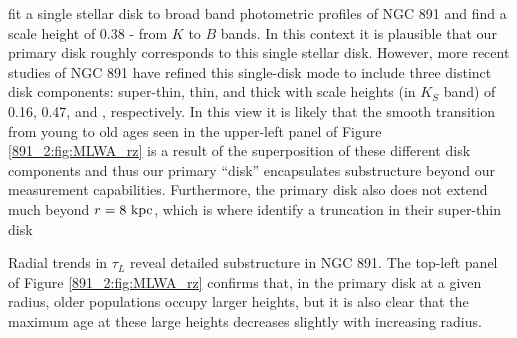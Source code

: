 \citet{Xilouris99} fit a single stellar disk to broad band photometric
profiles of NGC 891 and find a scale height of 0.38 - 
from $K$ to $B$ bands. In this context it is plausible that our
primary disk roughly corresponds to this single stellar disk. However,
more recent studies of NGC 891 \citep{Schechtman-Rook12,
  Schechtman-Rook13, Schechtman-Rook14} have refined this single-disk
mode to include three distinct disk components: super-thin, thin, and
thick with scale heights (in $K_S$ band) of 0.16, 0.47, and
, respectively. In this view it is likely that the
smooth transition from young to old ages seen in the upper-left panel
of Figure \ref{891_2:fig:MLWA_rz} is a result of the superposition of these
different disk components and thus our primary ``disk'' encapsulates
substructure beyond our measurement capabilities. Furthermore, the
primary disk also does not extend much beyond $r=8~\mathrm{kpc} $, which
is where \citet{Schechtman-Rook13} identify a truncation in their
super-thin disk




Radial trends in $\tau_L$ reveal detailed substructure in NGC 891. The
top-left panel of Figure \ref{891_2:fig:MLWA_rz} confirms that, in the
primary disk at a given radius, older populations occupy larger
heights, but it is also clear that the maximum age at these large
heights decreases slightly with increasing radius.

